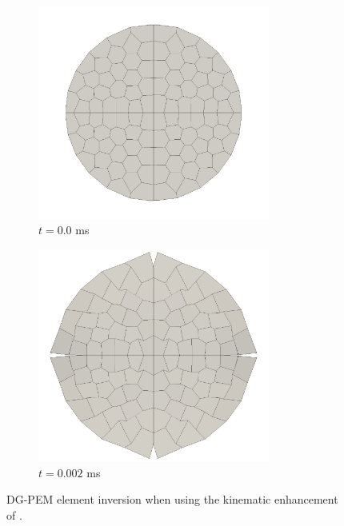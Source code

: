 \begin{figure}[!h]
  \centering
    \begin{subfigure}[b]{0.49\linewidth}
            \centering
            \includegraphics[width=3.0in]{figures/before_distortion.pdf}
    			\caption{$t = 0.0$ ms \label{fig:before_distortion}}
    \end{subfigure}
	\begin{subfigure}[b]{0.49\linewidth}
            \centering
            \includegraphics[width=3.0in]{figures/after_distortion.pdf}
    			\caption{$t = 0.002$ ms \label{fig:after_distortion}}
    \end{subfigure} \caption{DG-PEM element inversion when using the kinematic enhancement of \cite{Rashid:06}.}
  \label{fig:element_inversion}
\end{figure}

